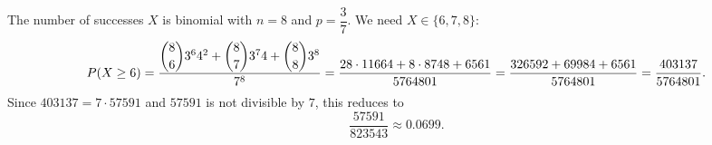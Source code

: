 The number of successes $X$ is binomial with $n=8$ and $p=\dfrac37$. We need $X\in\{6,7,8\}$:
\[P(X\ge6)=\dfrac{\dbinom86 3^6 4^2+\dbinom87 3^7 4+\dbinom88 3^8}{7^8}=\dfrac{28\cdot11664+8\cdot8748+6561}{5764801}=\dfrac{326592+69984+6561}{5764801}=\dfrac{403137}{5764801}.\]
Since $403137=7\cdot57591$ and $57591$ is not divisible by $7$, this reduces to
\[\boxed{\dfrac{57591}{823543}}\approx0.0699.\]
